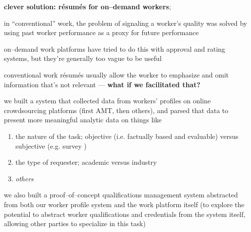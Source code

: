 \documentclass[main]{subfiles}
\begin{document}
    \textbf{clever solution: r\'{e}sum\'{e}s for on--demand workers};
    

  

  in ``conventional'' work, the problem of signaling a worker's quality was solved by using past worker performance as a proxy for future performance
  
  on--demand work platforms have tried to do this with approval and rating systems, but they're generally too vague to be useful
  
  conventional work r\'{e}sum\'{e}s usually allow the worker to emphasize and omit information that's not relevant --- \textbf{what if we facilitated that?}
  
  we built a system that collected data from workers' profiles on online crowdsourcing platforms
  (first AMT, then others), and parsed that data to present more meaningful analytic data on things like
  \begin{enumerate}
    \item the nature of the task; objective (i.e. factually based and evaluable) versus subjective (e.g. survey )
    \item the type of requester; academic versus industry
    \item \textit{others}
  \end{enumerate}
  we also built a proof--of--concept qualifications management system abstracted from both our worker profile system and the work platform itself
  (to explore the potential to abstract worker qualifications and credentials from the system itself, allowing other parties to specialize in this task)
  
\end{document}
